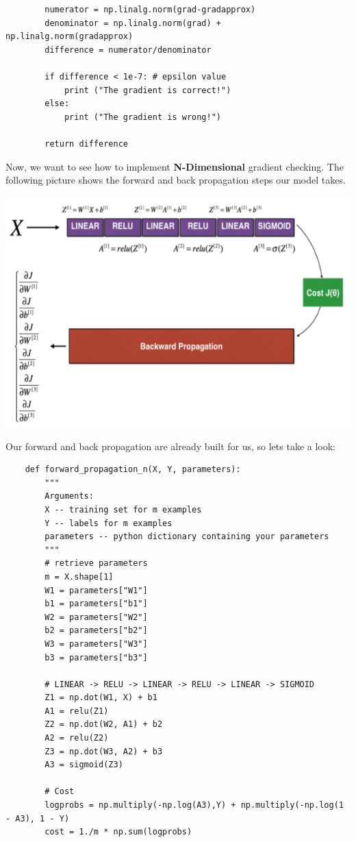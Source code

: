 \documentclass[11pt, a4paper]{article}
\begin{document}
\begin{spacing}{1.1}
\begin{lstlisting}
		numerator = np.linalg.norm(grad-gradapprox) 
		denominator = np.linalg.norm(grad) + np.linalg.norm(gradapprox)
		difference = numerator/denominator                          
		
		if difference < 1e-7: # epsilon value
			print ("The gradient is correct!")
		else:
			print ("The gradient is wrong!")
		
		return difference \end{lstlisting} \vspace*{3mm}
	Now, we want to see how to implement \textbf{N-Dimensional} gradient checking. The following picture shows the forward and back propagation steps our model takes. \\
	\begin{center}\includegraphics[scale=.65]{n_dim_grad_model} \end{center} \newpage

	\noindent Our forward and back propagation are already built for us, so lets take a look:
	\begin{lstlisting}
	def forward_propagation_n(X, Y, parameters):
		"""
		Arguments:
		X -- training set for m examples
		Y -- labels for m examples 
		parameters -- python dictionary containing your parameters
		"""
		# retrieve parameters
		m = X.shape[1]
		W1 = parameters["W1"]
		b1 = parameters["b1"]
		W2 = parameters["W2"]
		b2 = parameters["b2"]
		W3 = parameters["W3"]
		b3 = parameters["b3"]
		
		# LINEAR -> RELU -> LINEAR -> RELU -> LINEAR -> SIGMOID
		Z1 = np.dot(W1, X) + b1
		A1 = relu(Z1)
		Z2 = np.dot(W2, A1) + b2
		A2 = relu(Z2)
		Z3 = np.dot(W3, A2) + b3
		A3 = sigmoid(Z3)
		
		# Cost
		logprobs = np.multiply(-np.log(A3),Y) + np.multiply(-np.log(1 - A3), 1 - Y)
		cost = 1./m * np.sum(logprobs)
		

\end{lstlisting}
\end{spacing}
\end{document}

